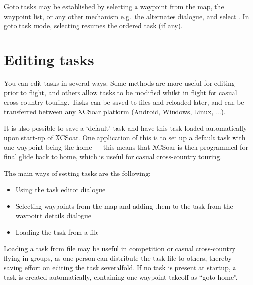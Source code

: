 Goto tasks may be established by selecting a waypoint from the map,
the waypoint list, or any other mechanism e.g.\ the alternates dialogue,
and select . In goto task mode, selecting
\blink{} resumes the ordered task (if
any).

\section{Editing tasks}

You can edit tasks in several ways.  Some methods are more useful for
editing prior to flight, and others allow tasks to be modified whilst
in flight for casual cross-country touring.  Tasks can be saved to
files and reloaded later, and can be transferred between any XCSoar
platform (Android, Windows, Linux, ...).

\tip It is also possible to save a `default' task and have this task loaded
automatically upon start-up of XCSoar.  One application of this is to
set up a default task with one waypoint being the home --- this means
that XCSoar is then programmed for final glide back to home, which is
useful for casual cross-country touring.

The main ways of setting tasks are the following:
\begin{itemize}
\item Using the task editor dialogue
\item Selecting waypoints from the map and adding them to the task from the
 waypoint details dialogue
\item Loading the task from a file
\end{itemize}

%

Loading a task from file may be useful in competition or casual
cross-country flying in groups, as one person can distribute the task
file to others, thereby saving effort on editing the task severalfold.
\tip
If no task is present at startup, a task is created automatically,
containing one waypoint takeoff as ``goto home''.

